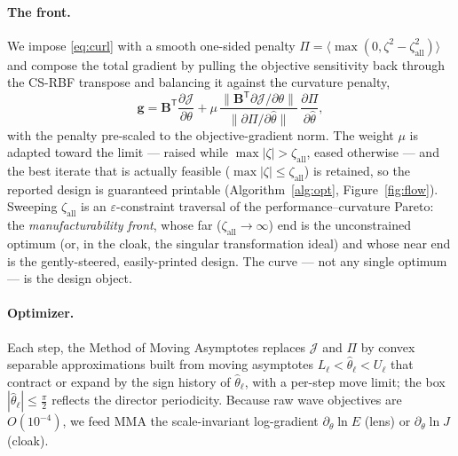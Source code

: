 \documentclass[preprint,11pt]{elsarticle}
\newcommand{\Tp}{^{\mathsf{T}}}
\newcommand{\zall}{\zeta_{\mathrm{all}}}
\theoremstyle{plain}\newtheorem{proposition}{Proposition}
\theoremstyle{remark}\newtheorem{remark}{Remark}
\begin{document}
\paragraph{The front.} We impose \eqref{eq:curl} with a smooth one-sided penalty
$\Pi=\langle\max(0,\zeta^2-\zall^2)\rangle$ and compose the total gradient by pulling the
objective sensitivity back through the CS-RBF transpose and balancing it against the
curvature penalty,
\begin{equation}
  \mathbf g=\mathbf B\Tp\frac{\partial\mathcal J}{\partial\theta}
  +\mu\,\frac{\lVert\mathbf B\Tp\partial\mathcal J/\partial\theta\rVert}
  {\lVert\partial\Pi/\partial\hat\theta\rVert}\,\frac{\partial\Pi}{\partial\hat\theta},
  \label{eq:gcompose}
\end{equation}
with the penalty pre-scaled to the objective-gradient norm. The weight $\mu$ is adapted
toward the limit --- raised while $\max|\zeta|>\zall$, eased otherwise --- and the best
iterate that is actually feasible ($\max|\zeta|\le\zall$) is retained, so the reported
design is guaranteed printable (Algorithm~\ref{alg:opt}, Figure~\ref{fig:flow}). Sweeping
$\zall$ is an $\varepsilon$-constraint traversal of the performance--curvature Pareto: the
\emph{manufacturability front}, whose far ($\zall\!\to\!\infty$) end is the unconstrained
optimum (or, in the cloak, the singular transformation ideal) and whose near end is the
gently-steered, easily-printed design. The curve --- not any single optimum --- is the
design object.

\paragraph{Optimizer.} Each step, the Method of Moving Asymptotes replaces $\mathcal J$ and
$\Pi$ by convex separable approximations built from moving asymptotes $L_\ell<\hat\theta_\ell
<U_\ell$ that contract or expand by the sign history of $\hat\theta_\ell$, with a per-step
move limit; the box $|\hat\theta_\ell|\le\tfrac\pi2$ reflects the director periodicity. Because
raw wave objectives are $O(10^{-4})$, we feed MMA the scale-invariant log-gradient
$\partial_\theta\ln E$ (lens) or $\partial_\theta\ln J$ (cloak).
\end{document}
